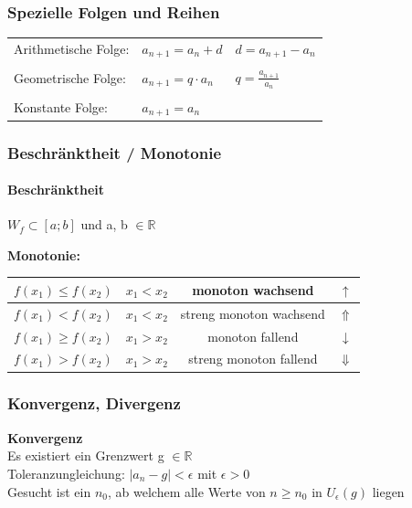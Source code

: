 		\subsubsection{Spezielle Folgen und Reihen}
			\begin{tabular}{lll}
				Arithmetische Folge: & $a_{n+1} = a_n + d$ & $d = a_{n+1} - a_n$ \\
				\\
				Geometrische Folge: & $a_{n+1} = q \cdot a_n $ & $q = \frac{a_{n+1}}{a_n}$ \\
				\\
				Konstante Folge: & $a_{n+1} = a_n$  & \\
			\end{tabular}				
				
		\subsubsection{Beschränktheit / Monotonie}
			\paragraph{Beschränktheit}
				$W_f \subset [a ; b]$ und a, b $\in \mathbb{R}$		
			
			\textbf{Monotonie:} \\
			
			\begin{tabular}{|c|c|c|c|}
				\hline
				$f(x_1) \leq f(x_2)$ & $x_1 < x_2$ & monoton wachsend & $\uparrow$\\
				\hline
				$f(x_1) < f(x_2)$ & $x_1 < x_2$ & streng monoton wachsend & $\Uparrow$\\
				\hline
				$f(x_1) \geq f(x_2)$ & $x_1 > x_2$ & monoton fallend & $\downarrow$\\
				\hline
				$f(x_1) > f(x_2)$ & $x_1 > x_2$ & streng monoton fallend & $\Downarrow$\\
				\hline
			\end{tabular}
			
		\subsubsection{Konvergenz, Divergenz}
			\textbf{Konvergenz} \\
				Es existiert ein Grenzwert g $\in \mathbb{R}$ \\
				Toleranzungleichung: $\vert a_n - g \vert < \epsilon$  mit $\epsilon > 0$ \\
				Gesucht ist ein $n_0$, ab welchem alle Werte von $n \geq n_0$ in $U_\epsilon(g)$ liegen \\
				
